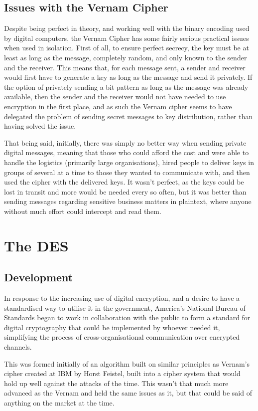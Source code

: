\documentclass[a4paper,12pt]{report}
\begin{document}
    \subsection{Issues with the Vernam Cipher}
Despite being perfect in theory, and working well with the binary encoding used
by digital computers, the Vernam Cipher has some fairly serious practical issues
when used in isolation. First of all, to ensure perfect secrecy, the key must be
at least as long as the message, completely random, and only known to the sender
and the receiver. This means that, for each message sent, a sender and receiver
would first have to generate a key as long as the message and send it privately.
If the option of privately sending a bit pattern as long as the message was
already available, then the sender and the receiver would not have needed to use
encryption in the first place, and as such the Vernam cipher seems to have
delegated the problem of sending secret messages to key distribution, rather
than having solved the issue.

That being said, initially, there was simply no better way when sending private
digital messages, meaning that those who could afford the cost and were able to
handle the logistics (primarily large organisations), hired people to deliver
keys in groups of several at a time to those they wanted to communicate with,
and then used the cipher with the delivered keys\cite{singh}. It wasn't perfect,
as the keys could be lost in transit and more would be needed every so often,
but it was better than sending messages regarding sensitive business matters in
plaintext, where anyone without much effort could intercept and read them.

  \section{The DES}
    \subsection{Development}
In response to the increasing use of digital encryption, and a desire to have a
standardised way to utilise it in the government, America's National Bureau of
Standards began to work in collaboration with the public to form a standard for
digital cryptography that could be implemented by whoever needed it, simplifying
the process of cross-organisational communication over encrypted channels.

This was formed initially of an algorithm built on similar principles as
Vernam's cipher created at IBM by Horst Feistel, built into a cipher system that
would hold up well against the attacks of the time. This wasn't that much more
advanced as the Vernam and held the same issues as it, but that could be said of
anything on the market at the time.
\end{document}
